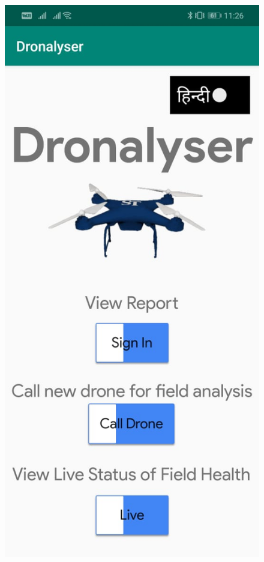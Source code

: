 \begin{figure}[H]
    \centering
    \includegraphics[scale=0.17]{SummerInterReport/project/Images-Major/app1.jpeg}

\end{figure}

